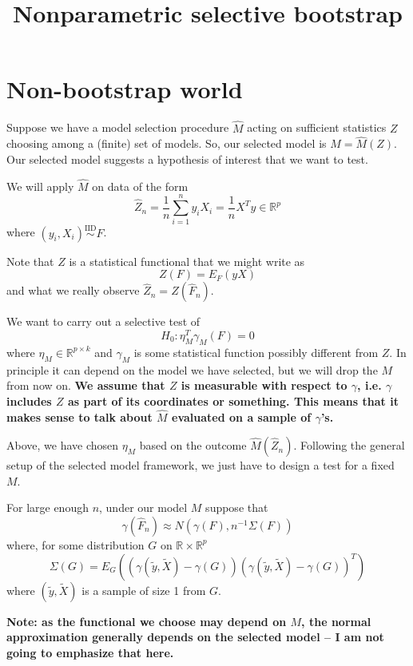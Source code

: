 \documentclass{article}
\newcommand{\real}{\mathbb{R}}
\begin{document}
\title{Nonparametric selective bootstrap}

\maketitle

\section{Non-bootstrap world}

Suppose we have a model selection procedure $\hat{M}$ acting on sufficient
statistics $Z$ choosing among a (finite) set of models. So, our selected model
is $M=\hat{M}(Z)$. Our selected model suggests a hypothesis of interest that we want to test.

We will apply $\hat{M}$ on data of the form
$$
\hat{Z}_n = \frac{1}{n} \sum_{i=1}^n y_i X_i = \frac{1}{n}X^Ty \in \real^p
$$
where $(y_i, X_i) \overset{\text{IID}}{\sim} F$. 

Note that $Z$ is a statistical functional that we might write as
$$
Z(F) = E_{F}(yX)
$$
and what we really observe $\hat{Z}_n = Z(\hat{F}_n)$. 

We want to carry out a selective test of
$$
H_0: \eta_{M}^T \gamma_M(F) = 0
$$
where $\eta_M \in \real^{p \times k}$ and $\gamma_M$ is some statistical
function possibly different from $Z$. In principle it can depend
on the model we have selected, but we will drop the $M$ from now on.
{\bf We assume that $Z$ is measurable with respect to $\gamma$, i.e.
$\gamma$ includes $Z$ as part of its coordinates or something. This means
that it makes sense to talk about $\hat{M}$ evaluated
on a sample of $\gamma$'s.}

Above, we have chosen $\eta_M$ based on the outcome $\hat{M}(\hat{Z}_n)$. Following the general setup of the
selected model framework, we just have to design
a test for a fixed $M$.

For large enough $n$, under our model $M$ suppose that
$$
\gamma(\hat{F}_n) \approx N(\gamma(F), n^{-1} \Sigma(F))
$$
where, for some distribution $G$ on $\real \times \real^p$
$$
\Sigma(G) = E_{G}\left((\gamma(\tilde{y},\tilde{X}) - \gamma(G))(\gamma(\tilde{y},\tilde{X}) - \gamma(G))^T \right)
$$
where $(\tilde{y}, \tilde{X})$ is a sample of size 1 from $G$.

{\bf Note: as the functional
we choose may depend on $M$, the normal approximation generally depends 
on the selected model -- I am not going to emphasize that here.}
\end{document}

